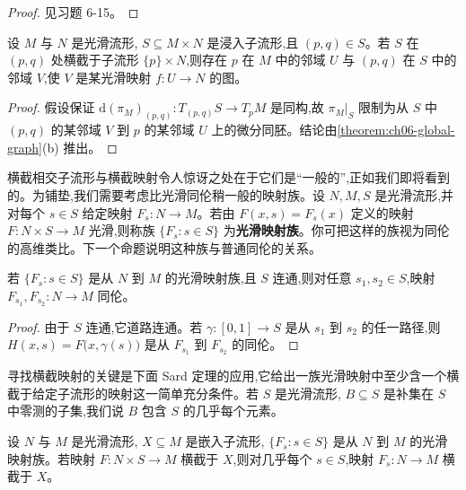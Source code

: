 \documentclass[../../main.tex]{subfiles}
\begin{document}
\begin{proof}
见习题 6-15。
\end{proof}

\begin{corollary}\label{corollary:ch06-local-graph}
设 $M$ 与 $N$ 是光滑流形, $S\subseteq M\times N$ 是浸入子流形,且 $(p,q)\in S$。若 $S$ 在 $(p,q)$ 处横截于子流形 $\{p\}\times N$,则存在 $p$ 在 $M$ 中的邻域 $U$ 与 $(p,q)$ 在 $S$ 中的邻域 $V$,使 $V$ 是某光滑映射 $f:U\to N$ 的图。
\end{corollary}

\begin{proof}
假设保证 $\mathrm{d}(\pi_M)_{(p,q)}:T_{(p,q)}S\to T_pM$ 是同构,故 $\pi_M|_S$ 限制为从 $S$ 中 $(p,q)$ 的某邻域 $V$ 到 $p$ 的某邻域 $U$ 上的微分同胚。结论由\cref{theorem:ch06-global-graph}(b) 推出。
\end{proof}

横截相交子流形与横截映射令人惊讶之处在于它们是``一般的'',正如我们即将看到的。为铺垫,我们需要考虑比光滑同伦稍一般的映射族。设 $N,M,S$ 是光滑流形,并对每个 $s\in S$ 给定映射 $F_s:N\to M$。若由 $F(x,s)=F_s(x)$ 定义的映射 $F:N\times S\to M$ 光滑,则称族 $\{F_s:s\in S\}$ 为\textbf{光滑映射族}。你可把这样的族视为同伦的高维类比。下一个命题说明这种族与普通同伦的关系。

\begin{proposition}\label{proposition:ch06-smooth-family-homotopic}
若 $\{F_s:s\in S\}$ 是从 $N$ 到 $M$ 的光滑映射族,且 $S$ 连通,则对任意 $s_1,s_2\in S$,映射 $F_{s_1},F_{s_2}:N\to M$ 同伦。
\end{proposition}

\begin{proof}
由于 $S$ 连通,它道路连通。若 $\gamma:[0,1]\to S$ 是从 $s_1$ 到 $s_2$ 的任一路径,则 $H(x,s)=F\bigl(x,\gamma(s)\bigr)$ 是从 $F_{s_1}$ 到 $F_{s_2}$ 的同伦。
\end{proof}

寻找横截映射的关键是下面 Sard 定理的应用,它给出一族光滑映射中至少含一个横截于给定子流形的映射这一简单充分条件。若 $S$ 是光滑流形, $B\subseteq S$ 是补集在 $S$ 中零测的子集,我们说 $B$ 包含 $S$ 的几乎每个元素。

\begin{theorem}\label{theorem:ch06-parametric-transversality}
设 $N$ 与 $M$ 是光滑流形, $X\subseteq M$ 是嵌入子流形, $\{F_s:s\in S\}$ 是从 $N$ 到 $M$ 的光滑映射族。若映射 $F:N\times S\to M$ 横截于 $X$,则对几乎每个 $s\in S$,映射 $F_s:N\to M$ 横截于 $X$。
\end{theorem}
\end{document}
